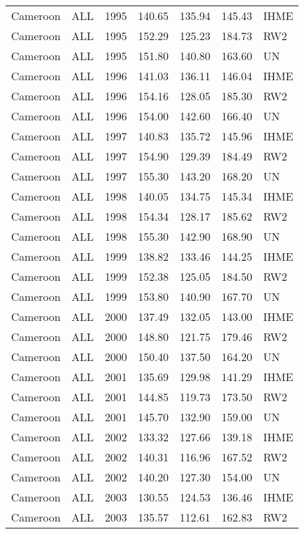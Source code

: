 \begin{longtable}{lllrrrl}
  Cameroon & ALL & 1995 & 140.65 & 135.94 & 145.43 & IHME \\ 
  Cameroon & ALL & 1995 & 152.29 & 125.23 & 184.73 & RW2 \\ 
  Cameroon & ALL & 1995 & 151.80 & 140.80 & 163.60 & UN \\ 
  Cameroon & ALL & 1996 & 141.03 & 136.11 & 146.04 & IHME \\ 
  Cameroon & ALL & 1996 & 154.16 & 128.05 & 185.30 & RW2 \\ 
  Cameroon & ALL & 1996 & 154.00 & 142.60 & 166.40 & UN \\ 
  Cameroon & ALL & 1997 & 140.83 & 135.72 & 145.96 & IHME \\ 
  Cameroon & ALL & 1997 & 154.90 & 129.39 & 184.49 & RW2 \\ 
  Cameroon & ALL & 1997 & 155.30 & 143.20 & 168.20 & UN \\ 
  Cameroon & ALL & 1998 & 140.05 & 134.75 & 145.34 & IHME \\ 
  Cameroon & ALL & 1998 & 154.34 & 128.17 & 185.62 & RW2 \\ 
  Cameroon & ALL & 1998 & 155.30 & 142.90 & 168.90 & UN \\ 
  Cameroon & ALL & 1999 & 138.82 & 133.46 & 144.25 & IHME \\ 
  Cameroon & ALL & 1999 & 152.38 & 125.05 & 184.50 & RW2 \\ 
  Cameroon & ALL & 1999 & 153.80 & 140.90 & 167.70 & UN \\ 
  Cameroon & ALL & 2000 & 137.49 & 132.05 & 143.00 & IHME \\ 
  Cameroon & ALL & 2000 & 148.80 & 121.75 & 179.46 & RW2 \\ 
  Cameroon & ALL & 2000 & 150.40 & 137.50 & 164.20 & UN \\ 
  Cameroon & ALL & 2001 & 135.69 & 129.98 & 141.29 & IHME \\ 
  Cameroon & ALL & 2001 & 144.85 & 119.73 & 173.50 & RW2 \\ 
  Cameroon & ALL & 2001 & 145.70 & 132.90 & 159.00 & UN \\ 
  Cameroon & ALL & 2002 & 133.32 & 127.66 & 139.18 & IHME \\ 
  Cameroon & ALL & 2002 & 140.31 & 116.96 & 167.52 & RW2 \\ 
  Cameroon & ALL & 2002 & 140.20 & 127.30 & 154.00 & UN \\ 
  Cameroon & ALL & 2003 & 130.55 & 124.53 & 136.46 & IHME \\ 
  Cameroon & ALL & 2003 & 135.57 & 112.61 & 162.83 & RW2 \\ 

\end{longtable}
